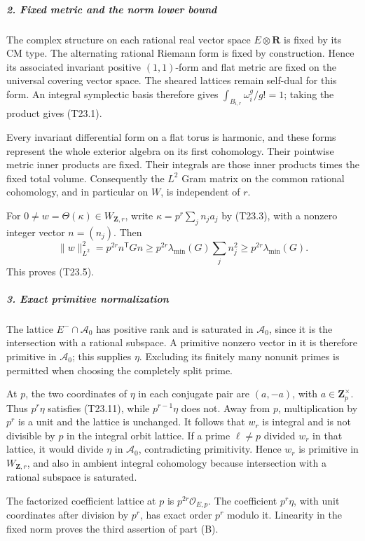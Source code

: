 \subparagraph{2. Fixed metric and the norm lower bound}\label{fixed-metric-and-the-norm-lower-bound}

The complex structure on each rational real vector space \(E\otimes\mathbf R\) is fixed by its CM type. The alternating rational Riemann form is fixed by construction. Hence its associated invariant positive \((1,1)\)-form and flat metric are fixed on the universal covering vector space. The sheared lattices remain self-dual for this form. An integral symplectic basis therefore gives \(\int_{B_{i,r}}\omega_i^g/g!=1\); taking the product gives (T23.1).

Every invariant differential form on a flat torus is harmonic, and these forms represent the whole exterior algebra on its first cohomology. Their pointwise metric inner products are fixed. Their integrals are those inner products times the fixed total volume. Consequently the \(L^2\) Gram matrix on the common rational cohomology, and in particular on \(W\), is independent of \(r\).

For \(0\ne w=\Theta(\kappa)\in W_{\mathbf Z,r}\), write \(\kappa=p^r\sum_j n_ja_j\) by (T23.3), with a nonzero integer vector \(n=(n_j)\). Then \[
 \|w\|_{L^2}^2
   =p^{2r}n^{\mathsf T}Gn
   \ge p^{2r}\lambda_{\min}(G)\sum_j n_j^2
   \ge p^{2r}\lambda_{\min}(G).
\] This proves (T23.5).

\subparagraph{3. Exact primitive normalization}\label{exact-primitive-normalization}

The lattice \(E^-\cap\mathcal A_0\) has positive rank and is saturated in \(\mathcal A_0\), since it is the intersection with a rational subspace. A primitive nonzero vector in it is therefore primitive in \(\mathcal A_0\); this supplies \(\eta\). Excluding its finitely many nonunit primes is permitted when choosing the completely split prime.

At \(p\), the two coordinates of \(\eta\) in each conjugate pair are \((a,-a)\), with \(a\in\mathbf Z_p^\times\). Thus \(p^r\eta\) satisfies (T23.11), while \(p^{r-1}\eta\) does not. Away from \(p\), multiplication by \(p^r\) is a unit and the lattice is unchanged. It follows that \(w_r\) is integral and is not divisible by \(p\) in the integral orbit lattice. If a prime \(\ell\ne p\) divided \(w_r\) in that lattice, it would divide \(\eta\) in \(\mathcal A_0\), contradicting primitivity. Hence \(w_r\) is primitive in \(W_{\mathbf Z,r}\), and also in ambient integral cohomology because intersection with a rational subspace is saturated.

The factorized coefficient lattice at \(p\) is \(p^{2r}\mathcal O_{E,p}\). The coefficient \(p^r\eta\), with unit coordinates after division by \(p^r\), has exact order \(p^r\) modulo it. Linearity in the fixed norm proves the third assertion of part (B).

